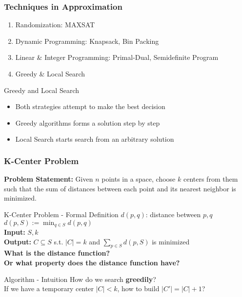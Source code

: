\documentclass{beamer}
\begin{document}
\begin{frame}
    \frametitle{Techniques in Approximation}
    \begin{enumerate}
        \item<1-> Randomization: MAXSAT
        \item<2-> Dynamic Programming: Knapsack, Bin Packing
        \item<3-> Linear \& Integer Programming: Primal-Dual, Semidefinite Program 
        \item<4-> \color{red} Greedy \& Local Search \color{black}
    \end{enumerate}
\end{frame}

\begin{frame}{Greedy and Local Search}
    \begin{itemize}
        \item<1-> Both strategies attempt to make the best decision
        \item<2-> Greedy algorithms forms a solution step by step 
        \item<3-> Local Search starts search from an arbitrary solution
    \end{itemize}
\end{frame}

\begin{frame}
    \frametitle{K-Center Problem}
    \textbf{Problem Statement:} Given $n$ points in a space, 
    choose $k$ centers from them such that the sum of distances between 
    each point and its nearest neighbor is minimized. 
\end{frame}

\begin{frame}{K-Center Problem - Formal Definition}
    $d(p, q)$: distance between $p, q$ \\ 
    $d(p, S) := \min_{q \in S} d(p, q)$ \\
    \textbf{Input:} $S, k$ \\
    \textbf{Output:} $C \subseteq S$ s.t. $|C| = k$ and  $\sum_{p \in S} d(p, S)$ 
    is minimized \\[20pt]
    \pause 
    \textbf{What is the distance function? \\ Or what property does the distance function have?}
\end{frame}

\begin{frame}{Algorithm - Intuition}
    How do we search \textbf{greedily}? \\[10pt]
    If we have a temporary center $|C| < k$, how to build $|C'| = |C| + 1$?
\end{frame}
\end{document}
